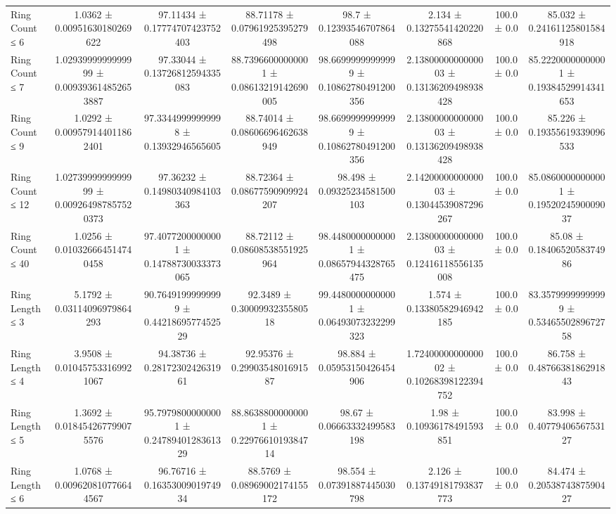 \begin{table}[H]
\begin{tabular}{l c c c c c c c}
        Ring Count ≤ 6 & 1.0362 ± 0.00951630180269622 & 97.11434 ± 0.17774707423752403 & 88.71178 ± 0.07961925395279498 & 98.7 ± 0.12393546707864088 & 2.134 ± 0.13275541420220868 & 100.0 ± 0.0 & 85.032 ± 0.24161125801584918 \\
        Ring Count ≤ 7 & 1.0293999999999999 ± 0.009393614852653887 & 97.33044 ± 0.13726812594335083 & 88.73966000000001 ± 0.08613219142690005 & 98.66999999999999 ± 0.10862780491200356 & 2.1380000000000003 ± 0.13136209498938428 & 100.0 ± 0.0 & 85.22200000000001 ± 0.19384529914341653 \\
        Ring Count ≤ 9 & 1.0292 ± 0.009579144011862401 & 97.33449999999998 ± 0.13932946565605 & 88.74014 ± 0.08606696462638949 & 98.66999999999999 ± 0.10862780491200356 & 2.1380000000000003 ± 0.13136209498938428 & 100.0 ± 0.0 & 85.226 ± 0.19355619339096533 \\
        Ring Count ≤ 12 & 1.0273999999999999 ± 0.009264987857520373 & 97.36232 ± 0.14980340984103363 & 88.72364 ± 0.08677590909924207 & 98.498 ± 0.09325234581500103 & 2.1420000000000003 ± 0.13044539087296267 & 100.0 ± 0.0 & 85.08600000000001 ± 0.1952024590009037 \\
        Ring Count ≤ 40 & 1.0256 ± 0.010326664514740458 & 97.40772000000001 ± 0.14788730033373065 & 88.72112 ± 0.08608538551925964 & 98.44800000000001 ± 0.08657944328765475 & 2.1380000000000003 ± 0.12416118556135008 & 100.0 ± 0.0 & 85.08 ± 0.1840652058374986 \\
        Ring Length ≤ 3 & 5.1792 ± 0.03114096979864293 & 90.76491999999999 ± 0.4421869577452529 & 92.3489 ± 0.3000993235580518 & 99.44800000000001 ± 0.06493073232299323 & 1.574 ± 0.13380582946942185 & 100.0 ± 0.0 & 83.35799999999999 ± 0.5346550289672758 \\
        Ring Length ≤ 4 & 3.9508 ± 0.010457533169921067 & 94.38736 ± 0.2817230242631961 & 92.95376 ± 0.2990354801691587 & 98.884 ± 0.05953150426454906 & 1.7240000000000002 ± 0.10268398122394752 & 100.0 ± 0.0 & 86.758 ± 0.4876638186291843 \\
        Ring Length ≤ 5 & 1.3692 ± 0.018454267799075576 & 95.79798000000001 ± 0.2478940128361329 & 88.86388000000001 ± 0.2297661019384714 & 98.67 ± 0.06663332499583198 & 1.98 ± 0.10936178491593851 & 100.0 ± 0.0 & 83.998 ± 0.4077940656753127 \\
        Ring Length ≤ 6 & 1.0768 ± 0.009620810776644567 & 96.76716 ± 0.1635300901974934 & 88.5769 ± 0.08969002174155172 & 98.554 ± 0.07391887445030798 & 2.126 ± 0.13749181793837773 & 100.0 ± 0.0 & 84.474 ± 0.2053874387590427 \\

\end{tabular}
\end{table}
